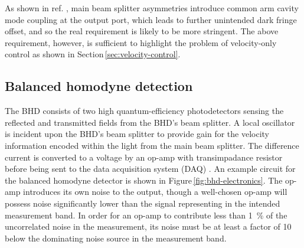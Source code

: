 As shown in ref. \cite{Danilishin2015}, main beam splitter asymmetries introduce common arm cavity mode coupling at the output port, which leads to further unintended dark fringe offset, and so the real requirement is likely to be more stringent. The above requirement, however, is sufficient to highlight the problem of velocity-only control as shown in Section\,\ref{sec:velocity-control}.

% 
\subsection{\label{sec:bhd}Balanced homodyne detection}
     
The \gls{BHD} consists of two high quantum-efficiency photodetectors sensing the reflected and transmitted fields from the \gls{BHD}'s beam splitter. A local oscillator is incident upon the \gls{BHD}'s beam splitter to provide gain for the velocity information encoded within the light from the main beam splitter. The difference current is converted to a voltage by an op-amp with transimpadance resistor \RT{} before being sent to the data acquisition system (\gls{DAQ}) . An example circuit for the balanced homodyne detector is shown in Figure\,\ref{fig:bhd-electronics}. The op-amp introduces its own noise to the output, though a well-chosen op-amp will possess noise significantly lower than the signal representing \LMINUS{} in the intended measurement band. In order for an op-amp to contribute less than \SI{1}{\percent} of the uncorrelated noise in the measurement, its noise must be at least a factor of \SI{10}{} below the dominating noise source in the measurement band.

